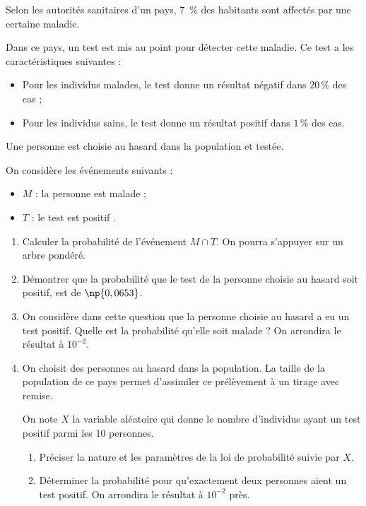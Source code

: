 \documentclass[french,no-indent,FontSize=11pt]{tango}
\begin{document}
Selon les autorités sanitaires d'un pays, 7~\% des habitants sont affectés par une certaine maladie.

Dans ce pays, un test est mis au point pour détecter cette maladie. Ce test a les caractéristiques suivantes :
\begin{itemize}
\item Pour les individus malades, le test donne un résultat négatif dans $20 \,\%$ des cas ;
\item Pour les individus sains, le test donne un résultat positif dans $1\,\%$ des cas.
\end{itemize}

Une personne est choisie au hasard dans la population et testée.

On considère les événements suivants :
\begin{itemize}
\item $M$ : \og la personne est malade \fg{} ;
\item $T$ : \og le test est positif \fg{}.
\end{itemize}

\begin{enumerate}
\item Calculer la probabilité de l'événement $M \cap T$. On pourra s'appuyer sur un arbre pondéré.
\item Démontrer que la probabilité que le test  de la personne choisie au hasard soit positif, est de $\np{0,0653}$.
\item On considère dans cette question que la personne choisie au hasard a eu un test positif.
Quelle est la probabilité qu'elle soit malade ? On arrondira le résultat à $10^{-2}$.
\item On choisit des personnes au hasard dans la population. La taille de la population de ce pays permet d'assimiler ce prélèvement à un tirage avec remise.

On note $X$ la variable aléatoire qui donne le nombre d'individus ayant un test positif parmi les 10 personnes. 
	\begin{enumerate}
		\item Préciser la nature et les paramètres de la loi de probabilité suivie par $X$.
		\item Déterminer la probabilité pour qu'exactement deux personnes aient un test positif. On arrondira le résultat à $10^{-2}$ près.
	\end{enumerate}	
\end{enumerate}

\end{document}
